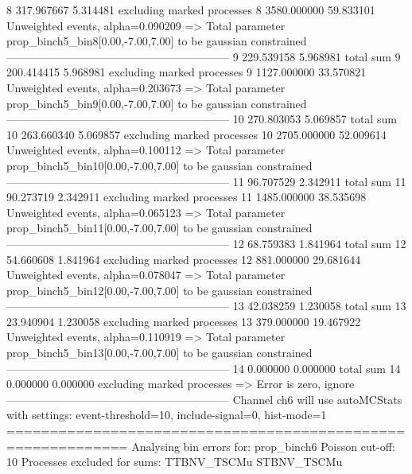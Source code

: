 8          317.967667      5.314481        excluding marked processes    
8          3580.000000     59.833101       Unweighted events, alpha=0.090209
  => Total parameter prop_binch5_bin8[0.00,-7.00,7.00] to be gaussian constrained
------------------------------------------------------------
9          229.539158      5.968981        total sum                     
9          200.414415      5.968981        excluding marked processes    
9          1127.000000     33.570821       Unweighted events, alpha=0.203673
  => Total parameter prop_binch5_bin9[0.00,-7.00,7.00] to be gaussian constrained
------------------------------------------------------------
10         270.803053      5.069857        total sum                     
10         263.660340      5.069857        excluding marked processes    
10         2705.000000     52.009614       Unweighted events, alpha=0.100112
  => Total parameter prop_binch5_bin10[0.00,-7.00,7.00] to be gaussian constrained
------------------------------------------------------------
11         96.707529       2.342911        total sum                     
11         90.273719       2.342911        excluding marked processes    
11         1485.000000     38.535698       Unweighted events, alpha=0.065123
  => Total parameter prop_binch5_bin11[0.00,-7.00,7.00] to be gaussian constrained
------------------------------------------------------------
12         68.759383       1.841964        total sum                     
12         54.660608       1.841964        excluding marked processes    
12         881.000000      29.681644       Unweighted events, alpha=0.078047
  => Total parameter prop_binch5_bin12[0.00,-7.00,7.00] to be gaussian constrained
------------------------------------------------------------
13         42.038259       1.230058        total sum                     
13         23.940904       1.230058        excluding marked processes    
13         379.000000      19.467922       Unweighted events, alpha=0.110919
  => Total parameter prop_binch5_bin13[0.00,-7.00,7.00] to be gaussian constrained
------------------------------------------------------------
14         0.000000        0.000000        total sum                     
14         0.000000        0.000000        excluding marked processes    
  => Error is zero, ignore      
------------------------------------------------------------
Channel ch6 will use autoMCStats with settings: event-threshold=10, include-signal=0, hist-mode=1
============================================================
Analysing bin errors for: prop_binch6
Poisson cut-off: 10
Processes excluded for sums: TTBNV_TSCMu STBNV_TSCMu
